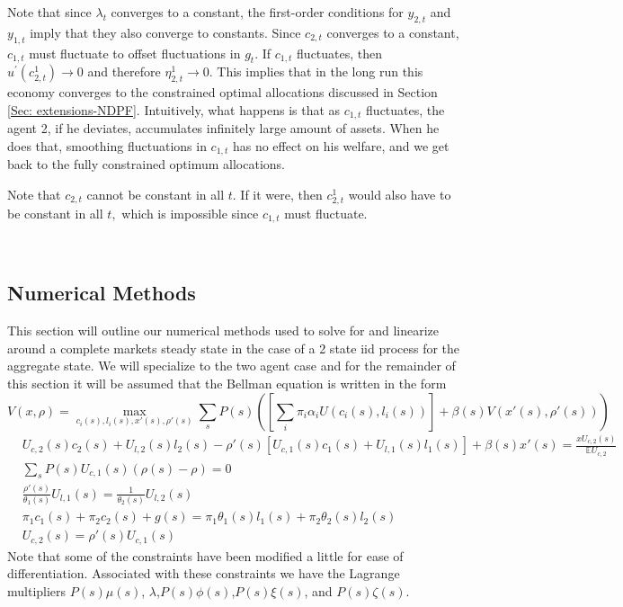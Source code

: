 \documentclass[thmsb,11pt]{article}
\begin{document}
{Note that since $\lambda _{t}$ converges to a constant, the first-order
conditions for $y_{2,t}$ and $y_{1,t}$ imply that they also converge to
constants. Since $c_{2,t}$ converges to a constant, $c_{1,t}$ must fluctuate
to offset fluctuations in $g_{t}.$ If $c_{1,t}$ fluctuates, then $u^{\prime
}\left( c_{2,t}^{1}\right) \rightarrow 0$ and therefore $\eta
_{2,t}^{1}\rightarrow 0.$ This implies that in the long run this economy
converges to the constrained optimal allocations discussed in Section \ref{Sec: extensions-NDPF}. Intuitively, what happens is that as $c_{1,t}$ fluctuates, the
agent 2, if he deviates, accumulates infinitely large amount of assets. When
he does that, smoothing fluctuations in $c_{1,t}$ has no effect on his
welfare, and we get back to the fully constrained optimum allocations.

\smallskip Note that $c_{2,t}$ cannot be constant in all $t.$ If it were,
then $c_{2,t}^{1}$ would also have to be constant in all $t,$ which is
impossible since $c_{1,t}$ must fluctuate.

\smallskip \ \pagebreak

\smallskip
\subsection{Numerical Methods}\label{apndx: numerical methods}
This section will outline our numerical methods used to solve for and linearize around a complete markets steady state in the case of a 2 state iid process for the aggregate state.  We will specialize to the two agent case and for the remainder of this section it will be assumed that the Bellman equation is written in the form
\begin{equation}
	V(x,\rho) = \max_{c_i(s),l_i(s),x'(s),\rho'(s)} \sum_s P(s)\left(\left[\sum_i\pi_i \alpha_i U(c_i(s),l_i(s))\right] + \beta(s) V(x'(s),\rho'(s))\right)\label{eq.obj}
\end{equation}
\begin{subequations}
\begin{align}
	&U_{c,2}(s)c_2(s)+U_{l,2}(s)l_2(s) - \rho'(s)\left[U_{c,1}(s)c_1(s)+U_{l,1}(s)l_1(s)\right]+ \beta(s)x'(s) = \frac{x U_{c,2}(s)}{\mathbb{E} U_{c,2}}\label{eq.imp_con}\\
	&\sum_s P(s) U_{c,1}(s)(\rho(s) -\rho) = 0\\
	&\frac{\rho'(s)}{\theta_1(s)}U_{l,1}(s) = \frac{1}{\theta_2(s)}U_{l,2}(s)\\
	& \pi_1 c_1(s)  +\pi_2 c_2(s) + g(s) = \pi_1\theta_1(s)l_1(s)+\pi_2\theta_2(s)l_2(s)\\
	& U_{c,2}(s) = \rho'(s) U_{c,1}(s)\label{eq.rho_con}
\end{align}\end{subequations}  Note that some of the constraints have been modified a little for ease of differentiation.  Associated with these constraints we have the Lagrange multipliers $P(s)\mu(s)$, $\lambda$,$P(s)\phi(s)$,$P(s)\xi(s)$, and $P(s)\zeta(s)$.
}
\end{document}
